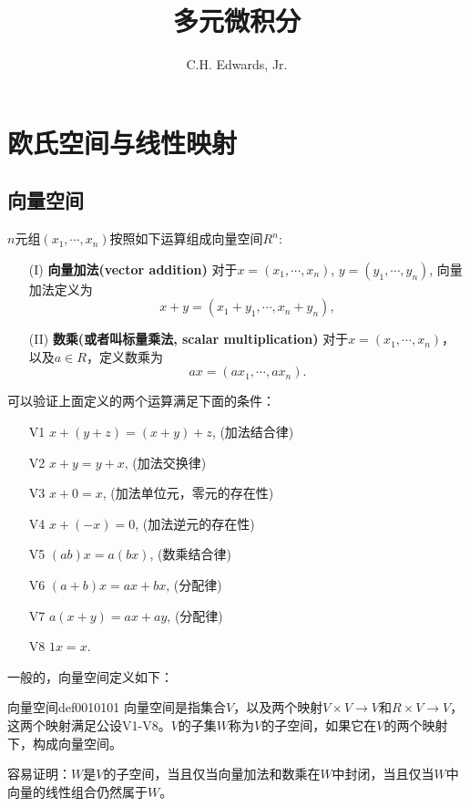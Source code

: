 \documentclass[cn,11pt,chinese]{elegantbook}
\title{多元微积分}
\author{C.H. Edwards, Jr.}
\numberwithin{equation}{section}
\begin{document}
%


\maketitle

\tableofcontents
\mainmatter
\hypersetup{pageanchor=true}

\chapter{欧氏空间与线性映射}\label{chapter001}
\section{向量空间}\label{section00101}
$n$元组$(x_1, \cdots, x_n)$按照如下运算组成向量空间$R^n$: 
\begin{enumerate}
\item[(I)]\textbf{向量加法(vector addition)} 对于$x = (x_1,\cdots, x_n)$, $y = (y_1,\cdots, y_n)$, 向量加法定义为
\[
x+y = (x_1+y_1,\cdots, x_n+y_n),
\]
\item[(II)]\textbf{数乘(或者叫标量乘法, scalar multiplication)} 对于$x = (x_1,\cdots, x_n)$，以及$a \in R$，定义数乘为
\[
ax = (ax_1, \cdots, ax_n).
\]
\end{enumerate}

可以验证上面定义的两个运算满足下面的条件：
\begin{enumerate}
\item[V1] $x + (y + z) = (x + y) + z$, \quad (加法结合律)
\item[V2] $x + y = y + x$, \quad (加法交换律)
\item[V3] $x+0=x$, \quad (加法单位元，零元的存在性)
\item[V4] $x + (-x) = 0$, \quad (加法逆元的存在性)
\item[V5] $(ab)x = a(bx)$, \quad (数乘结合律)
\item[V6] $(a+b)x = ax+bx$, \quad (分配律)
\item[V7] $a(x+y) = ax+ay$, \quad (分配律)
\item[V8] $1x = x$.
\end{enumerate}

一般的，向量空间定义如下：
\begin{definition}{向量空间}{def0010101}
向量空间是指集合$V$，以及两个映射$V \times V \to V$和$R \times V \to V$，这两个映射满足公设V1-V8。$V$的子集$W$称为$V$的子空间，如果它在$V$的两个映射下，构成向量空间。
\end{definition}

容易证明：$W$是$V$的子空间，当且仅当向量加法和数乘在$W$中封闭，当且仅当$W$中向量的线性组合仍然属于$W$。


% 

\appendix
\end{document}
